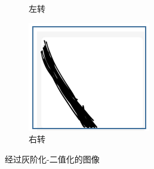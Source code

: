 \documentclass{report}
\begin{document}
\begin{figure}[ht]
\begin{subfigure}[b]{0.3\textwidth}
   \caption{左转}
   \label{fig:label}
 \end{subfigure}
 \hfill
 \begin{subfigure}[b]{0.3\textwidth}
   \centering
   \includegraphics[width=\textwidth]{figures/left.png}
   \caption{右转}
   \label{fig:label}
 \end{subfigure}
 \hfill
  \caption{经过灰阶化-二值化的图像}
\end{figure}
\end{document}
